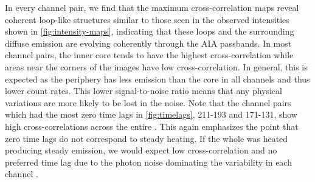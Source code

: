 In every channel pair, we find that the maximum cross-correlation maps reveal coherent loop-like structures similar to those seen in the observed intensities shown in \autoref{fig:intensity-maps}, indicating that these loops and the surrounding diffuse emission are evolving coherently through the AIA passbands.
In most channel pairs, the inner core tends to have the highest cross-correlation while areas near the corners of the images have low cross-correlation.
In general, this is expected as the periphery has less emission than the core in all channels and thus lower count rates.
This lower signal-to-noise ratio means that any physical variations are more likely to be lost in the noise.
Note that the channel pairs which had the most zero time lags in \autoref{fig:timelags}, 211-193 and 171-131, show high cross-correlations across the entire \AR{}.
This again emphasizes the point that zero time lags do not correspond to steady heating.
If the whole \AR{} was heated producing steady emission, we would expect low cross-correlation and no preferred time lag due to the photon noise dominating the variability in each channel \citep{viall_signatures_2016}.
